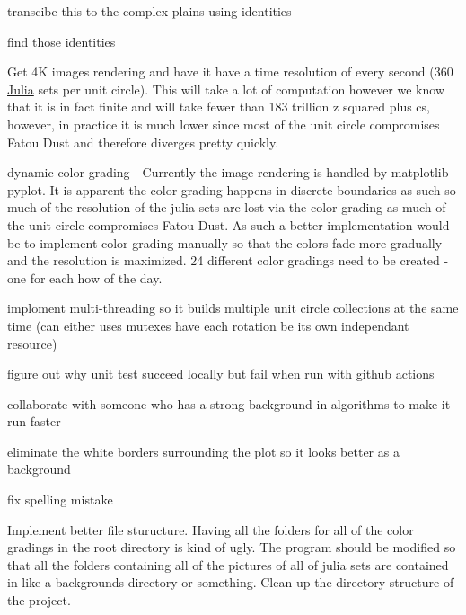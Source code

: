
\begin{DoxyRefList}
\item[Class \mbox{\hyperlink{classEulersSpiral_1_1EulersSpiral}{Eulers\+Spiral.Eulers\+Spiral}} ]\label{todo__todo000001}%
%
transcibe this to the complex plains using identities 

find those identities  
\item[Namespace \mbox{\hyperlink{namespaceJulia}{Julia}} ]\label{todo__todo000002}%
%
Get 4K images rendering and have it have a time resolution of every second (360 \mbox{\hyperlink{namespaceJulia}{Julia}} sets per unit circle). This will take a lot of computation however we know that it is in fact finite and will take fewer than 183 trillion z squared plus c\textquotesingle{}s, however, in practice it is much lower since most of the unit circle compromises Fatou Dust and therefore diverges pretty quickly. 

dynamic color grading -\/ Currently the image rendering is handled by matplotlib pyplot. It is apparent the color grading happens in discrete boundaries as such so much of the resolution of the julia sets are lost via the color grading as much of the unit circle compromises Fatou Dust. As such a better implementation would be to implement color grading manually so that the colors fade more gradually and the resolution is maximized. 24 different color gradings need to be created -\/ one for each how of the day. 

imploment multi-\/threading so it builds multiple unit circle collections at the same time (can either uses mutexes have each rotation be its own independant resource) 

figure out why unit test succeed locally but fail when run with github actions 

collaborate with someone who has a strong background in algorithms to make it run faster 

eliminate the white borders surrounding the plot so it looks better as a background  
\item[Member \mbox{\hyperlink{classJulia_1_1Julia_a966f5090e8ab789ab45b8bbe84435da9}{Julia.Julia.color\+\_\+map\+\_\+\+P\+IL}} (self, itterations\+\_\+til\+\_\+divergence)]\label{todo__todo000003}%
%
fix spelling mistake  
\item[Namespace \mbox{\hyperlink{namespaceJuliasClock}{Julias\+Clock}} ]\label{todo__todo000004}%
%
Implement better file sturucture. Having all the folders for all of the color gradings in the root directory is kind of ugly. The program should be modified so that all the folders containing all of the pictures of all of julia sets are contained in like a backgrounds directory or something. Clean up the directory structure of the project. 


\end{DoxyRefList}
